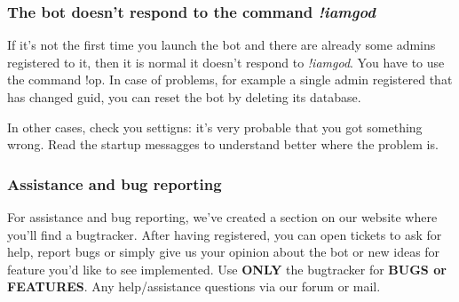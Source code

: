 \documentclass[a4paper]{article}
\begin{document}
\subsubsection{The bot doesn't respond to the command \textit{!iamgod}}
If it's not the first time you launch the bot and there are already some admins registered to it, then it is normal it doesn't
respond to \textit{!iamgod}. You have to use the command !op.
In case of problems, for example a single admin registered that has changed guid, you can reset the bot by deleting its database.

In other cases, check you settigns: it's very probable that you got something wrong. Read the startup messagges
to understand better where the problem is.

\subsubsection{Assistance and bug reporting}
\label{eng:assistance}
For assistance and bug reporting, we've created a section on our website where you'll find a bugtracker.
After having registered, you can open tickets to ask for help, report bugs or simply give us your opinion about the bot or new ideas
for feature you'd like to see implemented.
Use \textbf{ONLY} the bugtracker for \textbf{BUGS or FEATURES}.
Any help/assistance questions via our forum or mail.
\end{document}
